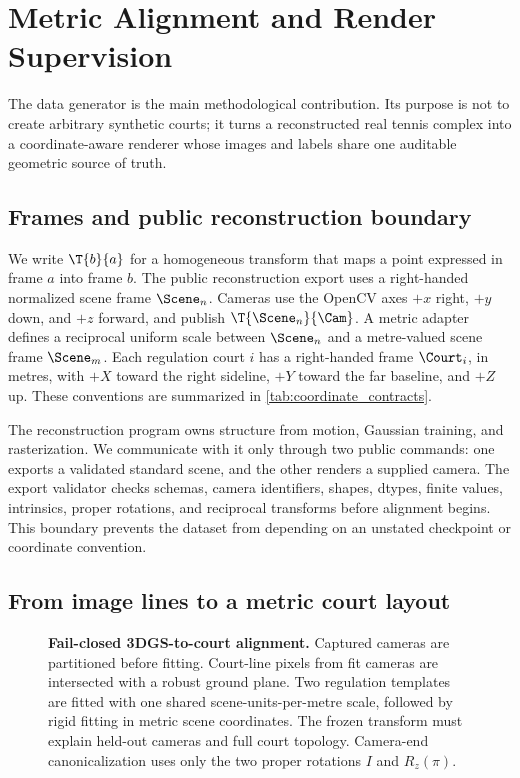 \section{Metric Alignment and Render Supervision}
\label{sec:render_supervision}

The data generator is the main methodological contribution.  Its purpose is
not to create arbitrary synthetic courts; it turns a reconstructed real tennis
complex into a coordinate-aware renderer whose images and labels share one
auditable geometric source of truth.

\subsection{Frames and public reconstruction boundary}
\label{sec:frames}

We write \(\T{b}{a}\) for a homogeneous transform that maps a point expressed
in frame \(a\) into frame \(b\).  The public reconstruction export uses a
right-handed normalized scene frame \(\Scene_n\).  Cameras use the OpenCV axes
\(+x\) right, \(+y\) down, and \(+z\) forward, and publish
\(\T{\Scene_n}{\Cam}\).  A metric adapter defines a reciprocal uniform scale
between \(\Scene_n\) and a metre-valued scene frame \(\Scene_m\).  Each
regulation court \(i\) has a right-handed frame \(\Court_i\), in metres, with
\(+X\) toward the right sideline, \(+Y\) toward the far baseline, and \(+Z\)
up.  These conventions are summarized in \cref{tab:coordinate_contracts}.

The reconstruction program owns structure from motion, Gaussian training, and
rasterization.  We communicate with it only through two public commands: one
exports a validated standard scene, and the other renders a supplied camera.
The export validator checks schemas, camera identifiers, shapes, dtypes,
finite values, intrinsics, proper rotations, and reciprocal transforms before
alignment begins.  This boundary prevents the dataset from depending on an
unstated checkpoint or coordinate convention.



\subsection{From image lines to a metric court layout}
\label{sec:alignment}

\begin{figure}[t]
  \centering
  \resizebox{\linewidth}{!}{}
  \caption{\textbf{Fail-closed 3DGS-to-court alignment.}  Captured cameras are
  partitioned before fitting.  Court-line pixels from fit cameras are intersected
  with a robust ground plane.  Two regulation templates are fitted with one
  shared scene-units-per-metre scale, followed by rigid fitting in metric scene
  coordinates.  The frozen transform must explain held-out cameras and full
  court topology.  Camera-end canonicalization uses only the two proper
  rotations \(I\) and \(R_z(\pi)\).}
  \label{fig:alignment}
\end{figure}

